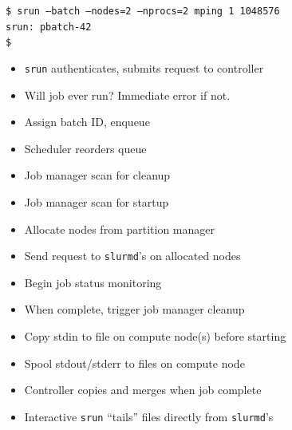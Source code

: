 \documentclass[letter,landscape]{seminar}
\begin{document}
\begin{slide}
  {\tt \$ srun --batch --nodes=2 --nprocs=2 mping 1 1048576}\\
  {\tt srun: pbatch-42}\\
  {\tt \$}
  \begin{itemize}
    \item{{\tt srun} authenticates, submits request to controller}
    \item{Will job ever run?  Immediate error if not.}
    \item{Assign batch ID, enqueue}
    \item{Scheduler reorders queue}
    \item{Job manager scan for cleanup}
    \item{Job manager scan for startup}
    \item{Allocate nodes from partition manager}
    \item{Send request to {\tt slurmd}'s on allocated nodes}
    \item{Begin job status monitoring}
    \item{When complete, trigger job manager cleanup}
  \end{itemize}
\end{slide}

\begin{slide}
  \begin{itemize}
    \item{Copy stdin to file on compute node(s) before starting}
    \item{Spool stdout/stderr to files on compute node}
    \item{Controller copies and merges when job complete}
    \item{Interactive {\tt srun} ``tails'' files directly from {\tt slurmd}'s}
  \end{itemize}
\end{slide}
\end{document}
